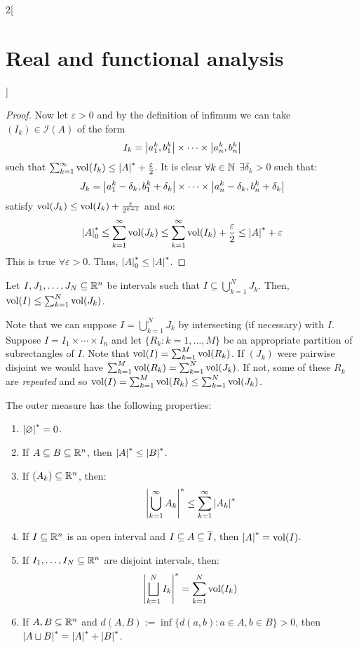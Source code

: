 \documentclass[../../../main_math.tex]{subfiles}
\begin{document}
\begin{multicols}{2}[\section{Real and functional analysis}]
\begin{proof}
    Now let $\varepsilon>0$ and by the definition of infimum we can take $(I_k)\in\mathcal{I}(A)$ of the form $$I_k=\abs{a_1^k,b_1^k}\times\cdots\times\abs{a_n^k,b_n^k}$$ such that $\sum_{k=1}^\infty\vol(I_k)\leq \om{A}+\frac{\varepsilon}{2}$.
    It is clear $\forall k\in\mathbb{N}$ $\exists\delta_k>0$ such that:
    $$J_k=\abs{a_1^k-\delta_k,b_1^k+\delta_k}\times\cdots\times\abs{a_n^k-\delta_k,b_n^k+\delta_k}$$
    satisfy $\operatorname{vol}(J_k)\leq\operatorname{vol}(I_k) +\frac{\varepsilon}{2^{k+1}}$ and so:
    $$\om{A}_0\leq \sum_{k=1}^\infty\vol(J_k)\leq\sum_{k=1}^\infty\vol(I_k) +\frac{\varepsilon}{2}\leq\om{A}+\varepsilon$$
    This is true $\forall \varepsilon>0$. Thus, $\om{A}_0\leq\om{A}$.
  \end{proof}
  \begin{lemma}
    Let $I,J_1,\ldots,J_N\subseteq \mathbb{R}^n$ be intervals such that $I\subseteq \bigcup_{k=1}^N J_k$. Then, $\operatorname{vol}(I)\leq\sum_{k=1}^N \operatorname{vol}(J_k)$.
  \end{lemma}
  \begin{sproof}
    Note that we can suppose $I=\bigcup_{k=1}^N J_k$ by intersecting (if necessary) with $I$. Suppose $I=I_1\times\cdots\times I_n$ and let $\{R_k:k=1,\ldots,M\}$ be an appropriate partition of subrectangles of $I$. Note that $\operatorname{vol}(I)=\sum_{k=1}^M\operatorname{vol}(R_k)$. If $(J_k)$ were pairwise disjoint we would have $\sum_{k=1}^M\operatorname{vol}(R_k)=\sum_{k=1}^{N}\operatorname{vol}(J_k)$. If not, some of these $R_k$ are \textit{repeated} and so $\operatorname{vol}(I)=\sum_{k=1}^M\operatorname{vol}(R_k)\leq\sum_{k=1}^{N}\operatorname{vol}(J_k)$.
  \end{sproof}
  \begin{theorem}
    The outer measure has the following properties:
    \begin{enumerate}
      \item $\om{\varnothing}=0$.
            \item\label{RFA_measureB} If $A\subseteq B\subseteq\mathbb{R}^n$, then $\om{A}\leq \om{B}$.
      \item \label{RFA_measureC} If $(A_k)\subseteq \mathbb{R}^n$, then: $$\om{\bigcup_{k=1}^\infty A_k}\leq \sum_{k=1}^\infty \om{A_k}$$
      \item \label{RFA_measureD}If $I\subseteq \mathbb{R}^n$ is an open interval and $I\subseteq A\subseteq \overline{I}$, then $\om{A}=\vol(I)$.
            \item\label{RFA_measureE} If $I_1,\ldots,I_N\subseteq \mathbb{R}^n$ are disjoint intervals, then: $$\displaystyle \om{\bigsqcup_{k=1}^N I_k}= \sum_{k=1}^N \vol(I_k)$$
      \item If $A,B\subseteq \mathbb{R}^n$ and $d(A,B):=\inf\{d(a,b):a\in A,b\in B\}>0$, then $\om{A\sqcup B}=\om{A}+\om{B}$.

\end{enumerate}
\end{theorem}
\end{multicols}
\end{document}
